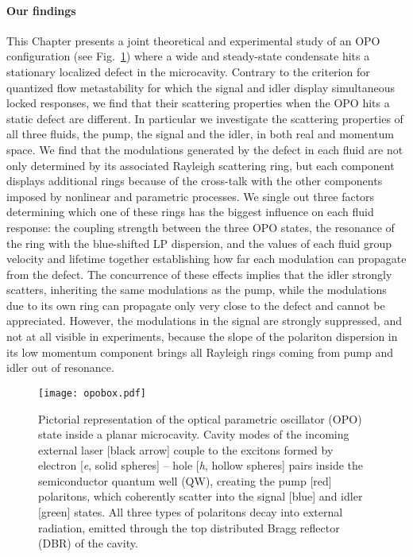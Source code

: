 \paragraph{Our findings}
This Chapter presents a joint theoretical and experimental study of an
OPO configuration (see Fig.~\ref{fig:opobox}) where a wide and
steady-state condensate hits a stationary localized defect in the
microcavity.  Contrary to the
criterion for quantized flow metastability for which the signal and
idler display simultaneous locked responses, we find that their
scattering properties when the OPO hits a static defect are different.
In particular we investigate the scattering properties of all three
fluids, the pump, the signal and the idler, in both real and momentum
space. We find that the modulations generated by the defect in each
fluid are not only determined by its associated Rayleigh scattering
ring, but each component displays additional rings because of the
cross-talk with the other components imposed by nonlinear and
parametric processes.  We single out three factors determining which
one of these rings has the biggest influence on each fluid response:
the coupling strength between the three OPO states, the resonance of
the ring with the blue-shifted LP dispersion, and the values of each
fluid group velocity and lifetime together establishing how far each
modulation can propagate from the defect.  The concurrence of these
effects implies that the idler strongly scatters, inheriting the same
modulations as the pump, while the modulations due to its own ring can
propagate only very close to the defect and cannot be
appreciated. However, the modulations in the signal are strongly
suppressed, and not at all visible in experiments, because the slope
of the polariton dispersion in its low momentum component brings all
Rayleigh rings coming from pump and idler out of resonance.
%
\begin{figure}[tb]\centering
  \texttt{[image: opobox.pdf]}
  \caption{
    Pictorial representation of the optical parametric oscillator
    (OPO) state inside a planar microcavity. Cavity modes of the incoming
    external laser [black arrow] couple to the excitons formed by electron
    [\textit{e}, solid spheres] -- hole [\textit{h}, hollow spheres] pairs
    inside the semiconductor quantum well (QW), creating the pump [red]
    polaritons, which coherently scatter into the signal [blue] and idler
    [green] states. All three types of polaritons decay into external
    radiation, emitted through the top distributed Bragg reflector (DBR)
    of the cavity.
  }\label{fig:opobox}
\end{figure}

